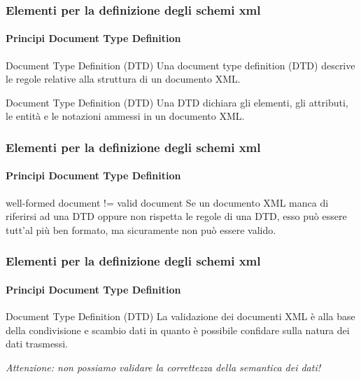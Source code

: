%

\begin{frame}
    \frametitle{Elementi per la definizione degli schemi xml}
    \framesubtitle{Principi Document Type Definition}
    \addtocounter{nframe}{1}

    \begin{block}{Document Type Definition (DTD)}
        Una document type definition (DTD) descrive le regole relative alla struttura di un documento XML.
    \end{block}

    \begin{block}{Document Type Definition (DTD)}
        Una DTD dichiara gli elementi, gli attributi, le entità e le notazioni ammessi in un documento XML.
    \end{block}

\end{frame}


\begin{frame}
    \frametitle{Elementi per la definizione degli schemi xml}
    \framesubtitle{Principi Document Type Definition}
    \addtocounter{nframe}{1}

    \begin{block}{well-formed document != valid document}
         Se un documento XML manca di riferirsi ad una DTD oppure non rispetta le regole di una DTD, esso può essere tutt'al più ben formato, ma sicuramente non può essere valido.
    \end{block}
\end{frame}

\begin{frame}
    \frametitle{Elementi per la definizione degli schemi xml}
    \framesubtitle{Principi Document Type Definition}
    \addtocounter{nframe}{1}

    \begin{block}{Document Type Definition (DTD)}
        La validazione dei documenti XML è alla base della condivisione e scambio dati in quanto è possibile confidare sulla natura dei dati trasmessi.
    \end{block}
   \textit{Attenzione: non possiamo validare la correttezza della semantica dei dati!}
\end{frame}

